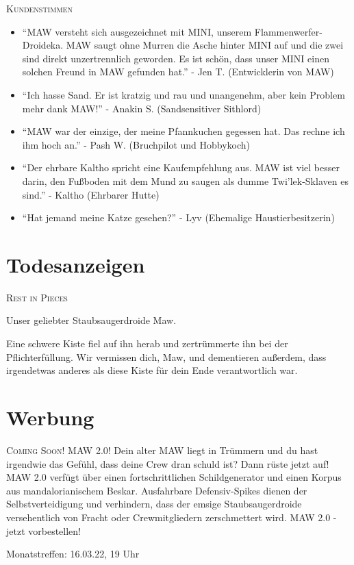 \documentclass[final]{multiversum}
\begin{document}
\noindent\textsc{Kundenstimmen}
\begin{itemize}
\item \enquote{MAW versteht sich ausgezeichnet mit MINI, unserem Flammenwerfer-Droideka.
      MAW saugt ohne Murren die Asche hinter MINI auf und die zwei sind direkt unzertrennlich geworden. 
      Es ist schön, dass unser MINI einen solchen Freund in MAW gefunden hat.}
      - Jen T. (Entwicklerin von MAW)
\item \enquote{Ich hasse Sand. 
      Er ist kratzig und rau und unangenehm, aber kein Problem mehr dank MAW!}
      - Anakin S. (Sandsensitiver Sithlord)
\item \enquote{MAW war der einzige, der meine Pfannkuchen gegessen hat.
      Das rechne ich ihm hoch an.}
      - Pash W. (Bruchpilot und Hobbykoch)
\item \enquote{Der ehrbare Kaltho spricht eine Kaufempfehlung aus.
      MAW ist viel besser darin, den Fußboden mit dem Mund zu saugen als dumme Twi'lek-Sklaven es sind.}
      - Kaltho (Ehrbarer Hutte)
\item \enquote{Hat jemand meine Katze gesehen?}
      - Lyv (Ehemalige Haustierbesitzerin)
\end{itemize}

\section{Todesanzeigen}
\textsc{Rest in Pieces}
\begin{center}Unser geliebter Staubsaugerdroide Maw.\end{center} 
Eine schwere Kiste fiel auf ihn herab und zertrümmerte ihn bei der Pflichterfüllung.
Wir vermissen dich, Maw, und dementieren außerdem, dass irgendetwas anderes als diese Kiste für dein Ende verantwortlich war. 

\section{Werbung}
\textsc{Coming Soon! MAW 2.0!}
Dein alter MAW liegt in Trümmern und du hast irgendwie das Gefühl, dass deine Crew dran schuld ist? 
Dann rüste jetzt auf! MAW 2.0 verfügt über einen fortschrittlichen Schildgenerator und einen Korpus aus mandalorianischem Beskar. Ausfahrbare Defensiv-Spikes dienen der Selbstverteidigung und verhindern, dass der emsige Staubsaugerdroide versehentlich von Fracht oder Crewmitgliedern zerschmettert wird. 
MAW 2.0 - jetzt vorbestellen!


\begin{termine}
\item Monatstreffen: 16.03.22, 19 Uhr
\end{termine}
\impressum
\end{document}
